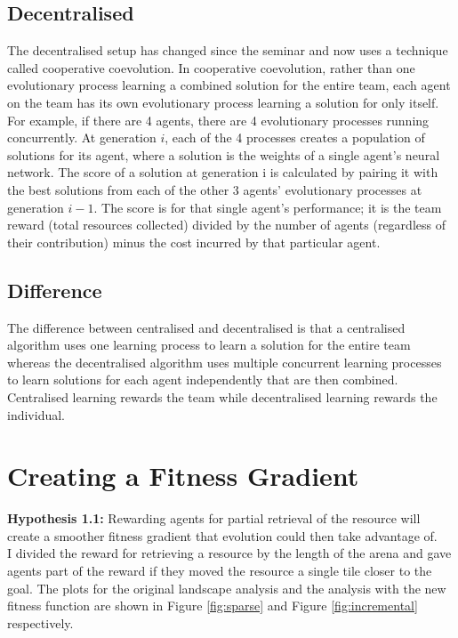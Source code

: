 \documentclass[12pt]{article}
\begin{document}
\subsection{Decentralised}

The decentralised setup has changed since the seminar and now uses a technique called cooperative coevolution. 
In cooperative coevolution, rather than one evolutionary process learning a combined solution for the entire team, each agent on the team has its own evolutionary process learning a solution for only itself. 
For example, if there are 4 agents, there are 4 evolutionary processes running concurrently. 
At generation $i$, each of the 4 processes creates a population of solutions for its agent, where a solution is the weights of a single agent’s neural network. 
The score of a solution at generation i is calculated by pairing it with the best solutions from each of the other 3 agents’ evolutionary processes at generation $i-1$. 
The score is for that single agent’s performance; it is the team reward (total resources collected) divided by the number of agents (regardless of their contribution) minus the cost incurred by that particular agent.\\

\subsection{Difference}

The difference between centralised and decentralised is that a centralised algorithm uses one learning process to learn a solution for the entire team whereas the decentralised algorithm uses multiple concurrent learning processes to learn solutions for each agent independently that are then combined. 
Centralised learning rewards the team while decentralised learning rewards the individual.\\

\section{Creating a Fitness Gradient}\label{smooth_fitness}

\textbf{Hypothesis 1.1:} Rewarding agents for partial retrieval of the resource will create a smoother fitness gradient that evolution could then take advantage of.\\

I divided the reward for retrieving a resource by the length of the arena and gave agents part of the reward if they moved the resource a single tile closer to the goal.
The plots for the original landscape analysis and the analysis with the new fitness function are shown in Figure \ref{fig:sparse} and Figure \ref{fig:incremental} respectively.\\
\end{document}
